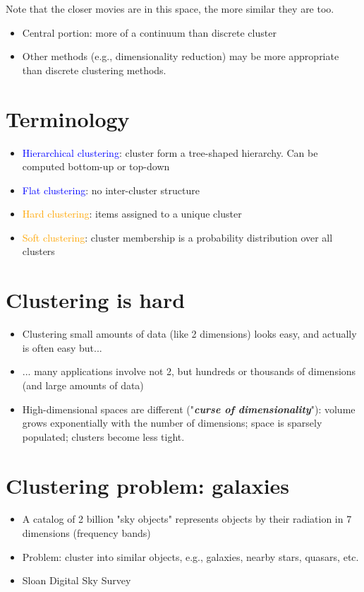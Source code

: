 \documentclass[11pt]{article}
\begin{document}
Note that the closer movies are in this space, the more similar they are too. 

\begin{itemize}
	\item Central portion: more of a continuum than discrete cluster
	\item Other methods (e.g., dimensionality reduction) may be more appropriate than discrete clustering methods.
\end{itemize}

\section*{Terminology}

\begin{itemize}
	\item \textcolor{blue}{Hierarchical clustering}: cluster form a tree-shaped hierarchy. Can be computed bottom-up or top-down
	\item \textcolor{blue}{Flat clustering}: no inter-cluster structure
	\item \textcolor{orange}{Hard clustering}: items assigned to a unique cluster
	\item \textcolor{orange}{Soft clustering}: cluster membership is a probability distribution over all clusters
\end{itemize}

\section*{Clustering is hard}
\begin{itemize}
	\item Clustering small amounts of data (like 2 dimensions) looks easy, and actually is often easy but...
	\item ... many applications involve not 2, but hundreds or thousands of dimensions (and large amounts of data)
	\item High-dimensional spaces are different ("\textit{\textbf{curse of dimensionality}}"): volume grows exponentially with the number of dimensions; space is sparsely populated; clusters become less tight. 
\end{itemize}

\section*{Clustering problem: galaxies}

\begin{itemize}
	\item A catalog of 2 billion "sky objects" represents objects by their radiation in 7 dimensions (frequency bands)
	\item Problem: cluster into similar objects, e.g., galaxies, nearby stars, quasars, etc. 
	\item Sloan Digital Sky Survey
\end{itemize}
\end{document}
